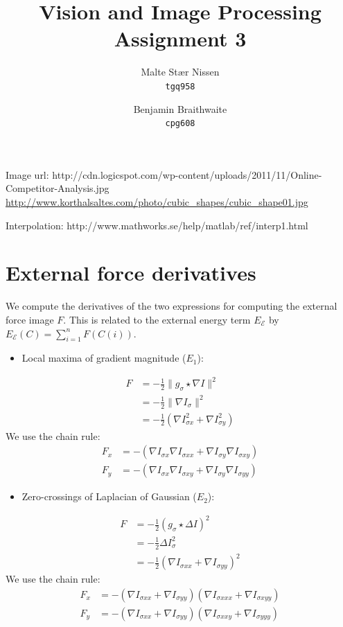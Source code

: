 \documentclass[11pt,a4paper]{article}
\title{Vision and Image Processing\\Assignment 3}
\author{Malte Stær Nissen \\ \texttt{tgq958} \and Benjamin Braithwaite \\
\texttt{cpg608}}
\begin{document}
\maketitle

Image url: http://cdn.logicspot.com/wp-content/uploads/2011/11/Online-Competitor-Analysis.jpg
\url{http://www.korthalsaltes.com/photo/cubic_shapes/cubic_shape01.jpg}

Interpolation: http://www.mathworks.se/help/matlab/ref/interp1.html

\section{External force derivatives}
%
We compute the derivatives of the two expressions for computing the external force image $F$. This is related to the external energy term $E_\mathcal{E}$ by $E_\mathcal{E}(C) = \sum_{i=1}^n F(C(i))$.
\begin{itemize}
\item Local maxima of gradient magnitude ($E_1$):
\end{itemize}
%
\begin{align}
F &= - \frac12 \| g_\sigma \star \nabla I \|^2 \\
&= - \frac12 \| \nabla I_{\sigma} \|^2 \\
&= - \frac12 (\nabla I_{\sigma x}^2 + \nabla I_{\sigma y}^2)
\end{align}
%
We use the chain rule:
%
\begin{align}
F_x &= - (\nabla I_{\sigma x} \nabla I_{\sigma xx} + \nabla I_{\sigma y} \nabla I_{\sigma xy}) \\
F_y &= - (\nabla I_{\sigma x} \nabla I_{\sigma xy} + \nabla I_{\sigma y} \nabla I_{\sigma yy})
\end{align}
%
\begin{itemize}
\item Zero-crossings of Laplacian of Gaussian ($E_2$):
\end{itemize}
%
\begin{align}
F &= - \frac12 ( g_\sigma \star \Delta I)^2 \\
&= - \frac12 \Delta I_{\sigma}^2 \\
&= - \frac12 (\nabla I_{\sigma xx} + \nabla I_{\sigma yy})^2
\end{align}
%
We use the chain rule:
%
\begin{align}
F_x &= - (\nabla I_{\sigma xx} + \nabla I_{\sigma yy}) (\nabla I_{\sigma xxx} + \nabla I_{\sigma xyy}) \\
F_y &= - (\nabla I_{\sigma xx} + \nabla I_{\sigma yy}) (\nabla I_{\sigma xxy} + \nabla I_{\sigma yyy})
\end{align}
%
\end{document}
